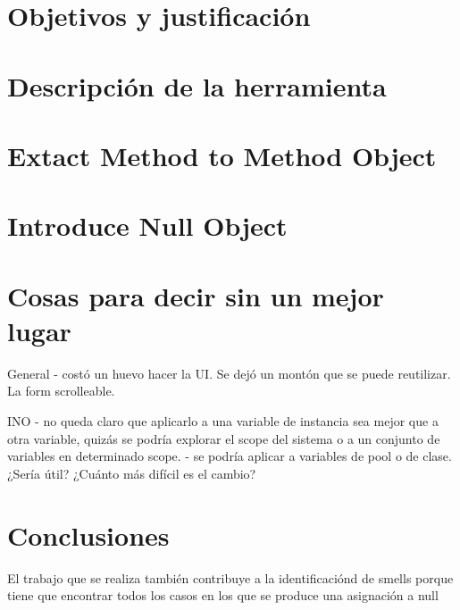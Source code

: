 \documentclass[11pt,a4paper,twoside]{tesis}
\begin{document}
\chapter{Objetivos y justificación}


\chapter{Descripción de la herramienta}


\chapter{Extact Method to Method Object}


\chapter{Introduce Null Object}


\chapter{Cosas para decir sin un mejor lugar}

General
- costó un huevo hacer la UI. Se dejó un montón que se puede reutilizar. La form scrolleable.

INO 
- no queda claro que aplicarlo a una variable de instancia sea mejor que a otra variable, quizás se podría
explorar el scope del sistema o a un conjunto de variables en determinado scope.
- se podría aplicar a variables de pool o de clase. ¿Sería útil? ¿Cuánto más difícil es el cambio?

\chapter{Conclusiones}

El trabajo que se realiza también contribuye a la identificaciónd de smells porque tiene que
encontrar todos los casos en los que se produce una asignación a null



\backmatter
%
\end{document}
